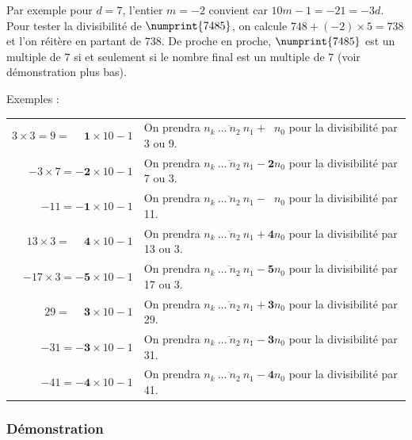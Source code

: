 \documentclass[a4paper]{article}
\begin{document}
	Par exemple pour $d = 7$, l'entier $m = -2$ convient car $10m - 1 = -21 = -3d$. Pour tester la divisibilité de $\numprint{7485}$, on calcule $748 + (-2) \times 5 = 738$ et l'on réitère en partant de $738$. De proche en proche, $\numprint{7485}$ est un multiple de $7$ si et seulement si le nombre final est un multiple de $7$ (voir démonstration plus bas).\\

\vfill

{\parindent=0.5cm Exemples :} 

\vspace{-3mm}

\begin{center}
\begin{tabular}{rl}

	$3 \times 3 = 9 = \mathbf{\phantom{-}1} \times 10 - 1$ & On prendra $\overline{n_{k}~\dots~n_{2}~n_{1}}~\mathbf{+~\phantom{1}}n_{0}$ pour la divisibilité par 3 ou 9.\\
	  $-3 \times 7 = \mathbf{-2} \times 10 - 1$ & On prendra $\overline{n_{k}~\dots~n_{2}~n_{1}}~\mathbf{-~2}n_{0}$ pour la divisibilité par 7 ou 3.\\
	     $-11 = \mathbf{-1} \times 10 - 1$ & On prendra $\overline{n_{{k}}~\dots~n_{2}~n_{1}}~\mathbf{-~\phantom{1}}n_{0}$ pour la divisibilité par 11.\\
	   $13 \times 3 = \mathbf{\phantom{-}4} \times 10 - 1$ & On prendra $\overline{n_{{k}}~\dots~n_{2}~n_{1}}~\mathbf{+~4}n_{0}$ pour la divisibilité par 13 ou 3.\\
	 $-17 \times 3 = \mathbf{-5} \times 10 - 1$ & On prendra $\overline{n_{{k}}~\dots~n_{2}~n_{1}}~\mathbf{-~5}n_{0}$ pour la divisibilité par 17 ou 3.\\
	      $29 = \mathbf{\phantom{-}3} \times 10 - 1$ & On prendra $\overline{n_{{k}}~\dots~n_{2}~n_{1}}~\mathbf{+~3}n_{0}$ pour la divisibilité par 29.\\
	     $-31 = \mathbf{-3} \times 10 - 1$ & On prendra $\overline{n_{{k}}~\dots~n_{2}~n_{1}}~\mathbf{-~3}n_{0}$ pour la divisibilité par 31.\\
	     $-41 = \mathbf{-4} \times 10 - 1$ & On prendra $\overline{n_{{k}}~\dots~n_{2}~n_{1}}~\mathbf{-~4}n_{0}$ pour la divisibilité par 41.\\

\end{tabular}
\end{center}

\vfill

\subsubsection*{Démonstration}
\end{document}
